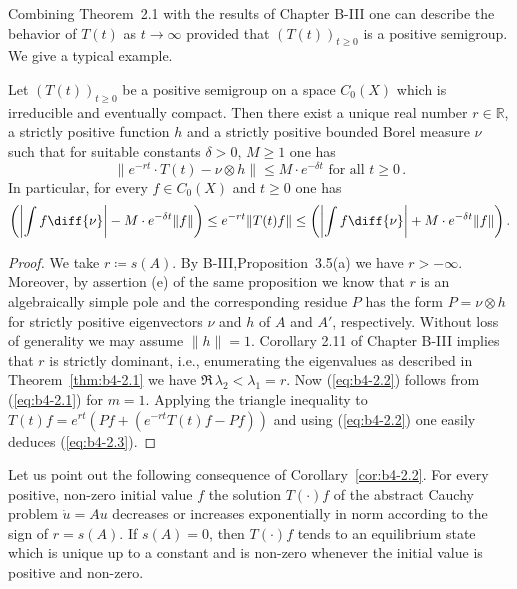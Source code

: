Combining Theorem~2.1 with the results of Chapter B-III one can describe
the behavior of $T(t)$ as $t \to \infty$ provided that $(T(t))_{t \geq 0}$ is a
positive semigroup.
We give a typical example.

\begin{corollary}\label{cor:b4-2.2}
	Let $(T(t))_{t \geq 0}$ be a positive semigroup on a space
	$C_{0}(X)$ which is irreducible and eventually compact.
	Then there exist a
	unique real number $r \in \mathbb{R}$, a strictly positive function $h$ and a
	strictly positive bounded Borel measure $\nu$ such that for suitable
	constants $\delta > 0$, $M \geq 1$ one has
	\begin{equation}\label{eq:b4-2.2}
		\|e^{-rt}\cdot T(t) - \nu\otimes h\| \leq M\cdot e^{-\delta t} \text{ for all } t \geq 0\,.
	\end{equation}
	In particular, for every $f \in C_{0}(X)$ and $t \geq 0$ one has
	\begin{equation}\label{eq:b4-2.3}\text{$
		\left(\left|\int f \diff{\nu}\right| - M\cdot e^{-\delta t}\|f\|\right) \leq e^{-rt}\|T(t)f\| \leq \left(\left|\int f \diff{\nu}\right| + M\cdot e^{-\delta t}\|f\|\right).$}
	\end{equation}
\end{corollary}

\begin{proof}
	We take $r  \coloneq  s(A)$.
	By B-III,Proposition~3.5(a) we have $r > -\infty$.
	Moreover, by assertion (e) of the same proposition we know that $r$ is
	an algebraically simple pole and the corresponding residue $P$ has the
	form $P = \nu \otimes h$ for strictly positive eigenvectors $\nu$ and $h$ of $A$
	and $A'$, respectively.
	Without loss of generality we may assume
	$\|h\| = 1$.
	Corollary 2.11 of Chapter B-III implies that $r$ is strictly
	dominant, i.e., enumerating the eigenvalues as described in Theorem~\ref{thm:b4-2.1} we
	have $\Re\,\lambda_2 < \lambda_1 = r$.
	Now (\ref{eq:b4-2.2}) follows from (\ref{eq:b4-2.1}) for $m = 1$.
%
%
%
%
\newpage
%
Applying the triangle inequality to $T(t)f = e^{rt}(Pf + (e^{-rt}T(t)f-Pf))$
and using (\ref{eq:b4-2.2}) one easily deduces (\ref{eq:b4-2.3}).
\end{proof}

Let us point out the following consequence of Corollary~\ref{cor:b4-2.2}.
For every positive, non-zero initial value $f$ the solution $T(\cdot)f$
of the abstract Cauchy problem $\dot{u} = Au$ decreases or increases
exponentially in norm according to the sign of $r = s(A)$.
If $s(A) = 0$, then $T(\cdot)f$ tends to an equilibrium state which is
unique up to a constant and is non-zero whenever the initial value is
positive and non-zero.

